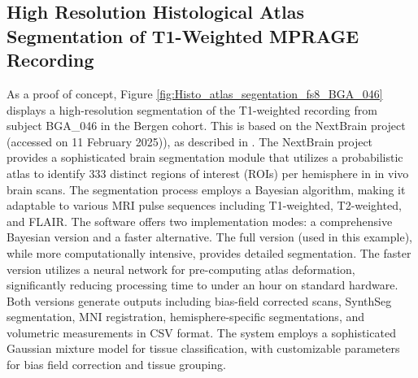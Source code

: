 \documentclass[diagnostics,article,accept,pdftex,moreauthors]{Definitions/mdpi}
\begin{document}
\subsection{High Resolution Histological Atlas Segmentation of T1-Weighted MPRAGE Recording}



As a proof of concept, Figure \ref{fig:Histo_atlas_segentation_fs8_BGA_046} displays a high-resolution segmentation of the T1-weighted recording from subject BGA\_046 in the Bergen cohort. This is based on the NextBrain project  (accessed on 11 February 2025)), %
as described in \cite{casamitjana2024next}.
The NextBrain project provides a sophisticated brain segmentation module that utilizes a probabilistic atlas to identify 333 distinct regions of interest (ROIs) per hemisphere in {{in vivo}} brain scans. The segmentation process employs a Bayesian algorithm, making it adaptable to various MRI pulse sequences including T1-weighted, T2-weighted, and FLAIR. The software offers two implementation modes: a comprehensive Bayesian version and a faster alternative. The full version (used in this example), while more computationally intensive, provides detailed segmentation. The faster version utilizes a neural network for pre-computing atlas deformation, significantly reducing processing time to under an hour on standard hardware. Both versions generate outputs including bias-field corrected scans, SynthSeg segmentation, MNI registration, hemisphere-specific segmentations, and volumetric measurements in CSV format. The system employs a sophisticated Gaussian mixture model for tissue classification, with customizable parameters for bias field correction and tissue grouping.
\end{document}
